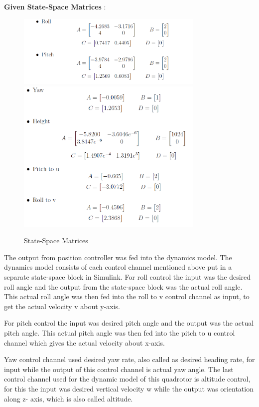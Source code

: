 \textbf{Given State-Space Matrices} : \\
\begin{figure}
	\centering
	\includegraphics[width=0.8\textwidth]{Images/ss_1}
	\includegraphics[width=0.8\textwidth]{Images/ss_2}
	\caption{State-Space Matrices}
	\label{fig:ss}
\end{figure}

The output from position controller was fed into the dynamics model. The dynamics model consists of each control channel mentioned above put in a separate state-space block in Simulink. For roll control the input was the desired roll angle and the output from the state-space block was the actual roll angle. This actual roll angle was then fed into the roll to v control channel as input, to get the actual velocity v about y-axis.

For pitch control the input was desired pitch angle and the output was the actual pitch angle. This actual pitch angle was then fed into the pitch to u control channel which gives the actual velocity about x-axis. 

Yaw control channel used desired yaw rate, also called as desired heading rate, for input while the output of this control channel is actual yaw angle. The last control channel used for the dynamic model of this quadrotor is altitude control, for this the input was desired vertical velocity w while the output was orientation along z- axis, which is also called altitude. 

